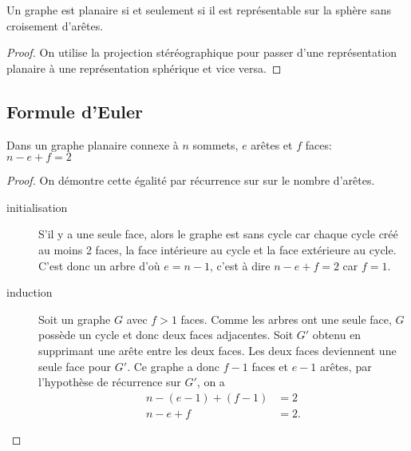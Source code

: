 \begin{mytheo}
  Un graphe est planaire si et seulement si il est représentable sur la sphère sans croisement d'arêtes.
  \begin{proof}
  On utilise la projection stéréographique pour passer d'une représentation planaire à une représentation sphérique et vice versa.
  \end{proof}
\end{mytheo}

\subsection{Formule d'Euler}
\begin{mytheo} 
  Dans un graphe planaire connexe à $n$ sommets, $e$ arêtes et $f$ faces:\\
  $n−e+f =2$
  \begin{proof}
    On démontre cette égalité par récurrence sur sur le nombre d'arêtes.
    \begin{description}
      \item[initialisation]
        S'il y a une seule face, alors le graphe est sans cycle car chaque cycle créé au moins 2 faces, la face intérieure au cycle
        et la face extérieure au cycle.
        C'est donc un arbre d'où $e = n-1$, c'est à dire $n - e + f = 2$ car $f = 1$.
      \item[induction]
        Soit un graphe $G$ avec $f > 1$ faces.
        Comme les arbres ont une seule face, $G$ possède un cycle et donc deux faces adjacentes.
        Soit $G'$ obtenu en supprimant une arête entre les deux faces.
        Les deux faces deviennent une seule face pour $G'$.
        Ce graphe a donc $f - 1$ faces et $e-1$ arêtes, par l'hypothèse de récurrence sur $G'$, on a
        \begin{align*}
          n - (e-1) + (f-1) & = 2\\
          n - e + f & = 2.
        \end{align*}
    \end{description}
  \end{proof}
\end{mytheo}

